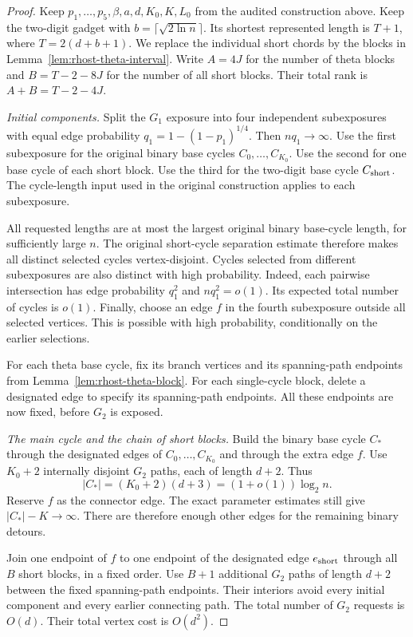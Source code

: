 \begin{proof}
Keep $p_1,\ldots,p_5,\beta,a,d,K_0,K,L_0$ from the audited construction above.
Keep the two-digit gadget with $b=\lceil\sqrt{2\ln n}\rceil$.
Its shortest represented length is $T+1$, where $T=2(d+b+1)$.
We replace the individual short chords by the blocks in Lemma~\ref{lem:rhost-theta-interval}.
Write $A=4J$ for the number of theta blocks and $B=T-2-8J$ for the number of all short blocks.
Their total rank is $A+B=T-2-4J$.

\emph{Initial components.}
Split the $G_1$ exposure into four independent subexposures with equal edge probability
$q_1=1-(1-p_1)^{1/4}$.
Then $nq_1\to\infty$.
Use the first subexposure for the original binary base cycles $C_0,\ldots,C_{K_0}$.
Use the second for one base cycle of each short block.
Use the third for the two-digit base cycle $C_{\rm short}$.
The cycle-length input used in the original construction applies to each subexposure.

All requested lengths are at most the largest original binary base-cycle length, for sufficiently large $n$.
The original short-cycle separation estimate therefore makes all distinct selected cycles vertex-disjoint.
Cycles selected from different subexposures are also distinct with high probability.
Indeed, each pairwise intersection has edge probability $q_1^2$ and $nq_1^2=o(1)$.
Its expected total number of cycles is $o(1)$.
Finally, choose an edge $f$ in the fourth subexposure outside all selected vertices.
This is possible with high probability, conditionally on the earlier selections.

For each theta base cycle, fix its branch vertices and its spanning-path endpoints from
Lemma~\ref{lem:rhost-theta-block}.
For each single-cycle block, delete a designated edge to specify its spanning-path endpoints.
All these endpoints are now fixed, before $G_2$ is exposed.

\emph{The main cycle and the chain of short blocks.}
Build the binary base cycle $C_*$ through the designated edges of
$C_0,\ldots,C_{K_0}$ and through the extra edge $f$.
Use $K_0+2$ internally disjoint $G_2$ paths, each of length $d+2$.
Thus
\[
 |C_*|=(K_0+2)(d+3)=(1+o(1))\log_2n.
\]
Reserve $f$ as the connector edge.
The exact parameter estimates still give $|C_*|-K\to\infty$.
There are therefore enough other edges for the remaining binary detours.

Join one endpoint of $f$ to one endpoint of the designated edge $e_{\rm short}$
through all $B$ short blocks, in a fixed order.
Use $B+1$ additional $G_2$ paths of length $d+2$ between the fixed spanning-path endpoints.
Their interiors avoid every initial component and every earlier connecting path.
The total number of $G_2$ requests is $O(d)$.
Their total vertex cost is $O(d^2)$.


\end{proof}
